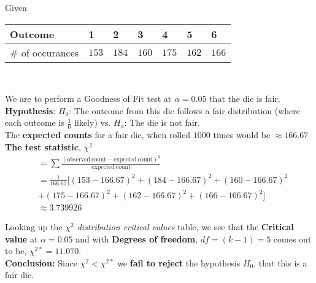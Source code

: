 \documentclass[boxes, qed]{homework}
\begin{document}
\begin{problem}
  Given\\

  \begin{tabular}{|l|l|l|l|l|l|l|}
    \hline
    Outcome & 1 & 2 & 3 & 4 & 5 & 6 \\
    \hline
    \# of occurances & $153$ & $184$ & $160$ & $175$ & $162$ & $166$ \\
    \hline
  \end{tabular}\\
\end{problem}
\begin{solution}
  We are to perform a Goodness of Fit test at $\alpha=0.05$ that the 
  die is fair.\\

  \textbf{Hypothesis}: $H_0$: The outcome from this die follows a fair distribution (where
  each outcome is $\frac{1}{6}$ likely) vs.
  $H_a$: The die is not fair. \\

  The \textbf{expected counts} for a fair die, when rolled $1000$ times would be $\approx 166.67$ \\

  \textbf{The test statistic}, $\chi^2$
  \begin{align*}
    &=\sum{\frac{(\mathrm{observed\ count}-\mathrm{expected\ count})^2}{\mathrm{expected\ count}}}\\
    &=\frac{1}{166.67} [
      (153-166.67)^2 
      +(184-166.67)^2
      +(160-166.67)^2 \\
      &+(175-166.67)^2 
      +(162-166.67)^2  
      +(166-166.67)^2 ]\\
    & \approx 3.739926
  \end{align*}

  Looking up the \textit{$\chi^2$ distribution critical values} table, we see that
  the \textbf{Critical value} at $\alpha=0.05$ and
  with \textbf{Degrees of freedom}, $df=(k-1)=5$ comes out to be,
  $\chi^{2*}=11.070$.\\

  \textbf{Conclusion:}
  Since $\chi^2<\chi^{2*}$ we \textbf{fail to reject} the hypothesis $H_0$, that this
  is a fair die.
\end{solution}
\end{document}
